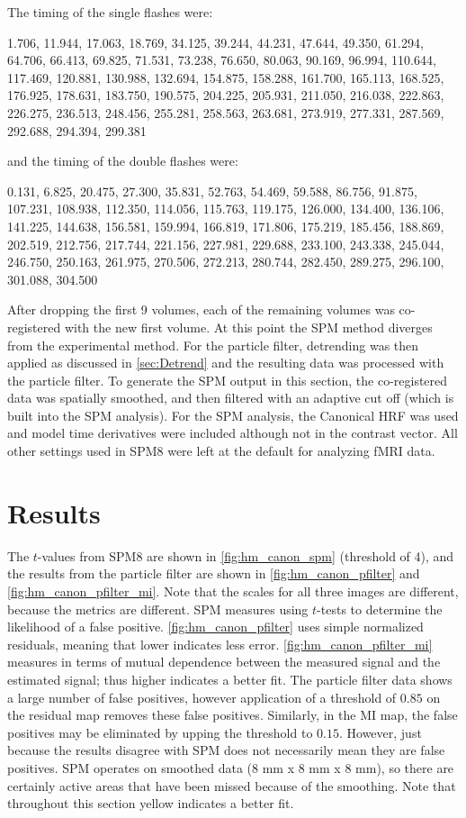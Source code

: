 The timing of the single flashes were:

1.706, 11.944, 17.063, 18.769, 34.125, 39.244, 44.231, 47.644, 49.350,
61.294, 64.706, 66.413, 69.825, 71.531, 73.238, 76.650, 80.063,
90.169, 96.994, 110.644, 117.469, 120.881, 130.988, 132.694, 154.875,
158.288, 161.700, 165.113, 168.525, 176.925, 178.631, 183.750, 190.575,
204.225, 205.931, 211.050, 216.038, 222.863, 226.275, 236.513, 248.456,
255.281, 258.563, 263.681, 273.919, 277.331, 287.569, 292.688, 294.394,
299.381

and the timing of the double flashes were:

0.131, 6.825, 20.475, 27.300, 35.831, 52.763, 54.469, 59.588, 86.756,
91.875, 107.231, 108.938, 112.350, 114.056, 115.763, 119.175, 126.000,
134.400, 136.106, 141.225, 144.638, 156.581, 159.994, 166.819, 171.806,
175.219, 185.456, 188.869, 202.519, 212.756, 217.744, 221.156, 227.981,
229.688, 233.100, 243.338, 245.044, 246.750, 250.163, 261.975, 270.506,
272.213, 280.744, 282.450, 289.275, 296.100, 301.088, 304.500

After dropping the first 9 volumes, each of the remaining volumes was
co-registered with the new first volume. At this point the \ac{SPM} method
diverges from the experimental method. For the particle filter, detrending
was then applied as discussed in \autoref{sec:Detrend} and the resulting
data was processed with the particle filter. To generate the \ac{SPM} output
in this section, the co-registered data was spatially smoothed,
and then filtered with an adaptive cut off (which is built into the
\ac{SPM} analysis). For the \ac{SPM} analysis, the Canonical \ac{HRF} was used
and model time derivatives were included although not in the contrast
vector. All other settings used in SPM8 were left at the default
for analyzing \ac{fMRI} data.

\section{Results}
The $t$-values from SPM8 are shown in \autoref{fig:hm_canon_spm} (threshold of
4), and the results from
the particle filter are shown in \autoref{fig:hm_canon_pfilter} and \autoref{fig:hm_canon_pfilter_mi}.
Note that the scales for all three images are different, because the metrics are different.
\ac{SPM} measures using $t$-tests to determine the likelihood of a false positive. \autoref{fig:hm_canon_pfilter}
uses simple normalized residuals, meaning that lower indicates less error.
\autoref{fig:hm_canon_pfilter_mi} measures in terms of mutual dependence between the
measured signal and the estimated signal; thus higher indicates a better fit. The particle
filter data shows a large number of false positives, however application of a threshold
of $0.85$ on the residual map removes these false positives. Similarly, in the \acl{MI}
map, the false positives may be eliminated by upping the threshold to $0.15$. However, just
because the results disagree with \ac{SPM} does not necessarily mean they are false positives.
\ac{SPM} operates on smoothed data (8 mm x 8 mm x 8 mm), so there are certainly active
areas that have been missed because of the smoothing. Note that throughout this
section yellow indicates a better fit.

